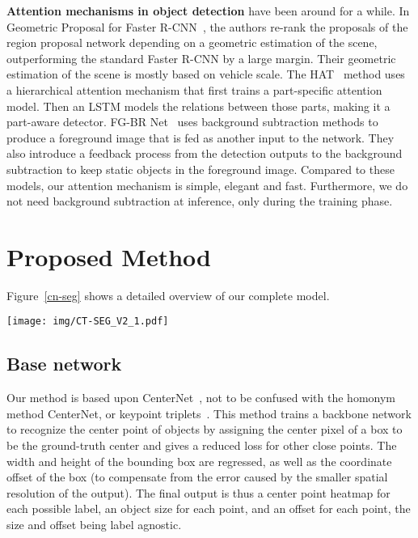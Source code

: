 \documentclass[10pt, conference, compsocconf]{IEEEtran}
\begin{document}
\textbf{Attention mechanisms in object detection} have been around for a while. In Geometric Proposal for Faster R-CNN~\cite{amin2017geometric}, the authors re-rank the proposals of the region proposal network depending on a geometric estimation of the scene, outperforming the standard Faster R-CNN by a large margin. Their geometric estimation of the scene is mostly based on vehicle scale. The HAT~\cite{wu2019hierarchical} method uses a hierarchical attention mechanism that first trains a part-specific attention model. Then an LSTM models the relations between those parts, making it a part-aware detector. FG-BR Net~\cite{fu2019foreground} uses background subtraction methods to produce a foreground image that is fed as another input to the network. They also introduce a feedback process from the detection outputs to the background subtraction to keep static objects in the foreground image. Compared to these models, our attention mechanism is simple, elegant and fast. Furthermore, we do not need background subtraction at inference, only during the training phase.  

\section{Proposed Method}

Figure~\ref{cn-seg} shows a detailed overview of our complete model. 

\begin{figure*}[t]
\begin{center}
\texttt{[image: img/CT-SEG\_V2\_1.pdf]}
\end{center}
   \caption{Overview of SpotNet: the input image first passes through a double-stacked hourglass network; the segmentation head then produces an attention map that multiplies the final feature map of the backbone network; the final center keypoint heatmap is then produced as well as the size and coordinate offset regressions for each object. }
\label{cn-seg}
\end{figure*}

\subsection{Base network}

Our method is based upon CenterNet~\cite{zhou2019objectsaspoints}, not to be confused with the homonym method CenterNet, or keypoint triplets~\cite{duan2019centernet}. This method trains a backbone network to recognize the center point of objects by assigning the center pixel of a box to be the ground-truth center and gives a reduced loss for other close points. The width and height of the bounding box are regressed, as well as the coordinate offset of the box (to compensate from the error caused by the smaller spatial resolution of the output). The final output is thus a center point heatmap for each possible label, an object size for each point, and an offset for each point, the size and offset being label agnostic. 
\end{document}

